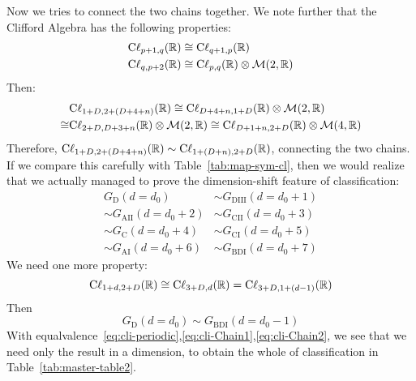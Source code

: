 \documentclass{article}
\begin{document}
Now we tries to connect the two chains together. We note further that the
Clifford Algebra has the following properties:
\begin{align}
    \mathrm{C\ell}_{p+1,q}(\mathbb{R}) &\cong \mathrm{C\ell}_{q+1,p}(\mathbb{R}) \\
    \mathrm{C\ell}_{q,p+2}(\mathbb{R}) &\cong \mathrm{C\ell}_{p,q}(\mathbb{R}) \otimes\mathcal{M}(2,\mathbb{R})
\end{align}
Then:
\begin{align}
    &\mathrm{C\ell}_{1+D,2+(D+4+n)}(\mathbb{R}) \cong
    \mathrm{C\ell}_{D+4+n,1+D}(\mathbb{R})\otimes\mathcal{M}(2,\mathbb{R}) \nonumber\\
    \cong& \mathrm{C\ell}_{2+D,D+3+n}(\mathbb{R})\otimes\mathcal{M}(2,\mathbb{R})
    \cong \mathrm{C\ell}_{D+1+n,2+D}(\mathbb{R})\otimes\mathcal{M}(4,\mathbb{R})
\end{align}
Therefore,
$\mathrm{C\ell}_{1+D,2+(D+4+n)}(\mathbb{R})\sim\mathrm{C\ell}_{1+(D+n),2+D}(\mathbb{R})$,
connecting the two chains. If we compare this carefully with
Table~\ref{tab:map-sym-cl}, then we would realize that we actually managed to
prove the dimension-shift feature of classification:
\begin{align}
    \label{eq:cli-Chain1}
    G_{\mathrm{D}}(d=d_0) &\sim G_{\mathrm{DIII}}(d=d_0+1) \nonumber\\
    \sim G_{\mathrm{AII}}(d=d_0+2) &\sim G_{\mathrm{CII}}(d=d_0+3) \nonumber\\
    \sim G_{\mathrm{C}}(d=d_0+4) &\sim G_{\mathrm{CI}}(d=d_0+5) \nonumber\\
    \sim G_{\mathrm{AI}}(d=d_0+6) &\sim G_{\mathrm{BDI}}(d=d_0+7)
\end{align}
We need one more property:
\begin{equation}
    \mathrm{C\ell}_{1+d,2+D}(\mathbb{R})\cong
    \mathrm{C\ell}_{3+D,d}(\mathbb{R})=\mathrm{C\ell}_{3+D,1+(d-1)}(\mathbb{R})
\end{equation}
Then
\begin{equation}
    \label{eq:cli-Chain2}
    G_{\mathrm{D}}(d=d_0) \sim G_{\mathrm{BDI}}(d=d_0-1)
\end{equation}
With equalvalence~\ref{eq:cli-periodic},\ref{eq:cli-Chain1},\ref{eq:cli-Chain2},
we see that we need only the result in a dimension, to obtain the whole of
classification in Table~\ref{tab:master-table2}.
\end{document}
